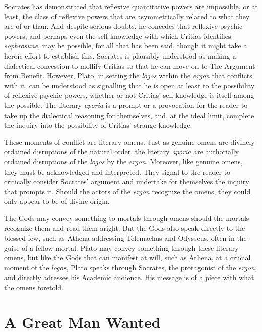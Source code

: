 Socrates has demonstrated that reflexive quantitative powers are impossible, or at least, the class of reflexive powers that are asymmetrically related to what they are of or than. And despite serious doubts, he concedes that reflexive psychic powers, and perhaps even the self-knowledge with which Critias identifies \emph{sōphrosunē}, may be possible, for all that has been said, though it might take a heroic effort to establish this. Socrates is plausibly understood as making a dialectical concession to mollify Critias so that he can move on to The Argument from Benefit. However, Plato, in setting the \emph{logos} within the \emph{ergon} that conflicts with it, can be understood as signalling that he is open at least to the possibility of reflexive psychic powers, whether or not Critias' self-knowledge is itself among the possible. The literary \emph{aporia} is a prompt or a provocation for the reader to take up the dialectical reasoning for themselves, and, at the ideal limit, complete the inquiry into the possibility of Critias' strange knowledge. 

These moments of conflict are literary omens. Just as genuine omens are divinely ordained disruptions of the natural order, the literary \emph{aporia} are authorially ordained disruptions of the \emph{logos} by the \emph{ergon}. Moreover, like genuine omens, they must be acknowledged and interpreted. They signal to the reader to critically consider Socrates' argument and undertake for themselves the inquiry that prompts it. Should the actors of the \emph{ergon} recognize the omens, they could only appear to be of divine origin. 

The Gods may convey something to mortals through omens should the mortals recognize them and read them aright. But the Gods also speak directly to the blessed few, such as Athena addressing Telemachus and Odysseus, often in the guise of a fellow mortal. Plato may convey something through these literary omens, but like the Gods that can manifest at will, such as Athena, at a crucial moment of the \emph{logos}, Plato speaks through Socrates, the protagonist of the \emph{ergon}, and directly adresses his Academic audience. His message is of a piece with what the omens foretold.


\section{A Great Man Wanted} %
\label{sec:a_great_man_wanted}

